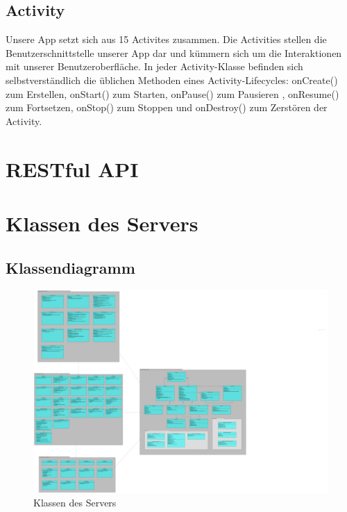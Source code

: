 \documentclass[a4paper]{scrreprt}
\begin{document}
	
	 \subsection{Activity} 
Unsere App setzt sich aus 15 Activites zusammen. Die Activities stellen die Benutzerschnittstelle unserer App dar und kümmern sich um die Interaktionen mit unserer Benutzeroberfläche. In jeder Activity-Klasse befinden sich selbstverständlich die üblichen Methoden eines Activity-Lifecycles: onCreate() zum Erstellen, onStart() zum Starten, onPause() zum Pausieren , onResume() zum Fortsetzen, onStop() zum Stoppen und onDestroy() zum Zerstören der Activity.
	
	    
	\clearpage
	
	\clearpage
	
	\clearpage
	
	\clearpage
	\section{RESTful API}
	
	\clearpage
	\section{Klassen des Servers}
		\subsection{Klassendiagramm}
		\begin{figure}[H]
	       \centering
	       \includegraphics[scale = .05]{server-packages.png}
	       \caption{Klassen des Servers}
	      \end{figure}
\end{document}
